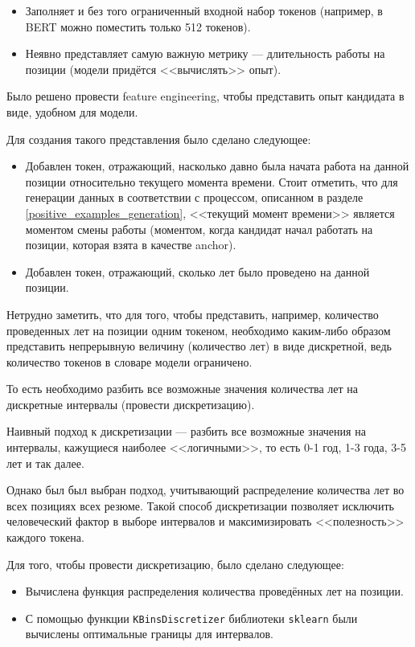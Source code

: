 \documentclass[14pt]{mmcs_article}
\begin{document}
\begin{itemize}
  \item Заполняет и без того ограниченный входной набор токенов (например, в BERT можно поместить только 512 токенов).
  \item Неявно представляет самую важную метрику — длительность работы на позиции (модели придётся <<вычислять>> опыт).
\end{itemize}

Было решено провести feature engineering, чтобы представить опыт кандидата в виде, удобном для модели.

Для создания такого представления было сделано следующее:

\begin{itemize}
  \item Добавлен токен, отражающий, насколько давно была начата работа на данной позиции относительно текущего момента времени. Стоит отметить, что для генерации данных в соответствии с процессом, описанном в разделе \ref{positive_examples_generation}, <<текущий момент времени>> является моментом смены работы (моментом, когда кандидат начал работать на позиции, которая взята в качестве anchor).
  \item Добавлен токен, отражающий, сколько лет было проведено на данной позиции.
\end{itemize}

Нетрудно заметить, что для того, чтобы представить, например, количество проведенных лет на позиции одним токеном, необходимо каким-либо образом представить непрерывную величину (количество лет) в виде дискретной, ведь количество токенов в словаре модели ограничено.

То есть необходимо разбить все возможные значения количества лет на дискретные интервалы (провести дискретизацию).

Наивный подход к дискретизации --- разбить все возможные значения на интервалы, кажущиеся наиболее <<логичными>>, то есть 0-1 год, 1-3 года, 3-5 лет и так далее.

Однако был был выбран подход, учитывающий распределение количества лет во всех позициях всех резюме. Такой способ дискретизации позволяет исключить человеческий фактор в выборе интервалов и максимизировать <<полезность>> каждого токена.

Для того, чтобы провести дискретизацию, было сделано следующее:

\begin{itemize}
  \item Вычислена функция распределения количества проведённых лет на позиции.
  \item С помощью функции \texttt{KBinsDiscretizer} библиотеки \texttt{sklearn} \cite{pedregosa2018scikitlearnmachinelearningpython} были вычислены оптимальные границы для интервалов.
\end{itemize}
\end{document}
